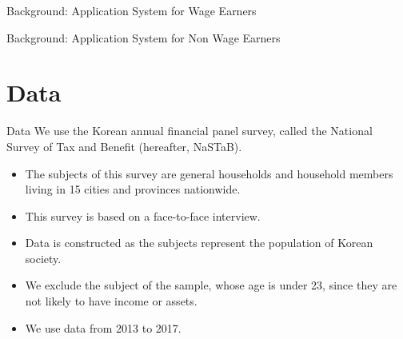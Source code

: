 \documentclass[
  ignorenonframetext,
  aspectratio=169,
]{beamer}
\providecommand{\tightlist}{%
  \setlength{\itemsep}{0pt}\setlength{\parskip}{0pt}}
\begin{document}
\begin{frame}{Background: Application System for Wage Earners}
\protect\hypertarget{background-application-system-for-wage-earners}{}
\end{frame}

\begin{frame}{Background: Application System for Non Wage Earners}
\protect\hypertarget{background-application-system-for-non-wage-earners}{}
\end{frame}

\hypertarget{data}{%
\section{Data}\label{data}}

\begin{frame}{Data}
\protect\hypertarget{data-1}{}
We use the Korean annual financial panel survey,
called the National Survey of Tax and Benefit (hereafter, NaSTaB).

\begin{itemize}
\tightlist
\item
  The subjects of this survey are general households and household members living in 15 cities and provinces nationwide.
\item
  This survey is based on a face-to-face interview.
\item
  Data is constructed as the subjects represent the population of Korean society.
\item
  We exclude the subject of the sample, whose age is under 23, since they are not likely to have income or assets.
\item
  We use data from 2013 to 2017.
\end{itemize}
\end{frame}
\end{document}
